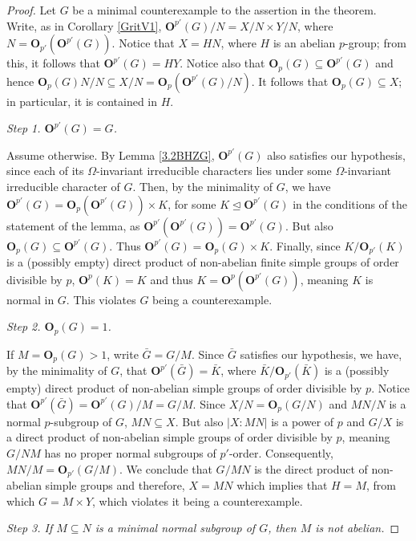 \documentclass[12pt]{amsart}
\theoremstyle{theorem}
\theoremstyle{definition}
\newcommand{\bO}{{\mathbf O}}
\begin{document}
	\begin{proof}
		Let $G$ be a minimal counterexample to the assertion in the theorem. Write, as in Corollary \ref{GritV1}, $\bO^{p'}(G)/N = X/N \times Y/N$, where $N = \bO_{p'}(\bO^{p'}(G))$. Notice that $X = HN$, where $H$ is an abelian $p$-group; from this, it follows that $\bO^{p'}(G) = HY$. Notice also that $\bO_p(G)\subseteq\bO^{p'}(G)$ and hence $\bO_p(G)N/N\subseteq X/N=\bO_p(\bO^{p'}(G)/N)$. It follows that $\bO_p(G) \subseteq X$; in particular, it is contained in $H$.
		\bigskip
	
		\textit{Step 1. $\bO^{p'}(G) = G$.}
		\medskip
	
		Assume otherwise. By Lemma \ref{3.2BHZG}, $\bO^{p'}(G)$ also satisfies our hypothesis, since each of its $\Omega$-invariant irreducible characters lies under some $\Omega$-invariant irreducible character of $G$. Then, by the minimality of $G$, we have $\bO^{p'}(G) = \bO_p(\bO^{p'}(G)) \times K$, for some $K \unlhd \bO^{p'}(G)$ in the conditions of the statement of the lemma, as $\bO^{p'}(\bO^{p'}(G)) = \bO^{p'}(G)$. But also $\bO_p(G) \subseteq \bO^{p'}(G)$. Thus $\bO^{p'}(G) = \bO_p(G) \times K$. Finally, since $K/\bO_{p'}(K)$ is a (possibly empty) direct product of non-abelian finite simple groups of order divisible by $p$, $\bO^p(K) = K$ and thus $K = \bO^p(\bO^{p'}(G))$, meaning $K$ is normal in $G$. This violates $G$ being a counterexample.
		\bigskip
	
		\textit{Step 2. $\bO_p(G) = 1$.}
		\medskip
	
		If $M=\bO_p(G)>1$, write $\bar{G}=G/M$. Since $\bar{G}$ satisfies our hypothesis, we have, by the minimality of $G$, that $\bO^{p'}(\bar{G})=\bar{K}$, where $\bar{K}/\bO_{p'}(\bar{K})$ is a (possibly empty) direct product of non-abelian simple groups of order divisible by $p$. Notice that $\bO^{p'}(\bar{G})=\bO^{p'}(G)/M = G/M$. Since $X/N = \bO_p(G/N)$ and $MN/N$ is a normal $p$-subgroup of $G$, $MN \subseteq X$. But also $|X:MN|$ is a power of $p$ and $G/X$ is a direct product of non-abelian simple groups of order divisible by $p$, meaning $G/NM$ has no proper normal subgroups of $p'$-order. Consequently, $MN/M = \bO_{p'}(G/M)$. We conclude that $G/MN$ is the direct product of non-abelian simple groups and therefore, $X=MN$ which implies that $H=M$, from which $G = M \times Y$, which violates it being a counterexample.
		\bigskip
	
		\textit{Step 3. If $M \subseteq N$ is a minimal normal subgroup of $G$, then $M$ is not abelian.}
		\medskip
	

\end{proof}
\end{document}
